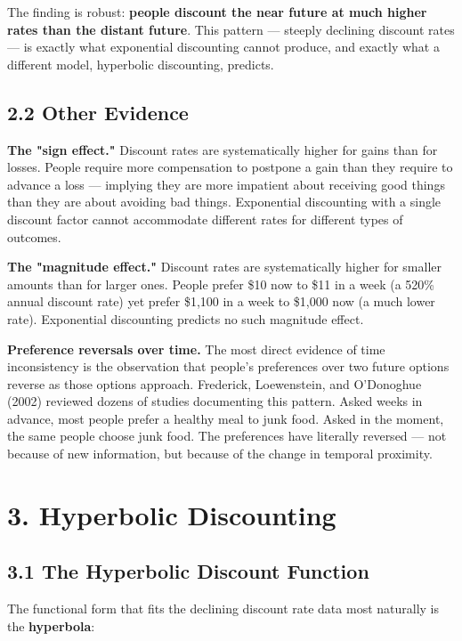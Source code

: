 \documentclass[12pt, letterpaper]{article}
\begin{document}
The finding is robust: \textbf{people discount the near future at much higher rates than the distant future}. This pattern --- steeply declining discount rates --- is exactly what exponential discounting cannot produce, and exactly what a different model, hyperbolic discounting, predicts.


\subsection{2.2 Other Evidence}


\textbf{The "sign effect."} Discount rates are systematically higher for gains than for losses. People require more compensation to postpone a gain than they require to advance a loss --- implying they are more impatient about receiving good things than they are about avoiding bad things. Exponential discounting with a single discount factor cannot accommodate different rates for different types of outcomes.

\textbf{The "magnitude effect."} Discount rates are systematically higher for smaller amounts than for larger ones. People prefer \$10 now to \$11 in a week (a 520\% annual discount rate) yet prefer \$1,100 in a week to \$1,000 now (a much lower rate). Exponential discounting predicts no such magnitude effect.

\textbf{Preference reversals over time.} The most direct evidence of time inconsistency is the observation that people's preferences over two future options reverse as those options approach. Frederick, Loewenstein, and O'Donoghue (2002) reviewed dozens of studies documenting this pattern. Asked weeks in advance, most people prefer a healthy meal to junk food. Asked in the moment, the same people choose junk food. The preferences have literally reversed --- not because of new information, but because of the change in temporal proximity.

\medskip


\section{3. Hyperbolic Discounting}



\subsection{3.1 The Hyperbolic Discount Function}


The functional form that fits the declining discount rate data most naturally is the \textbf{hyperbola}:
\end{document}
